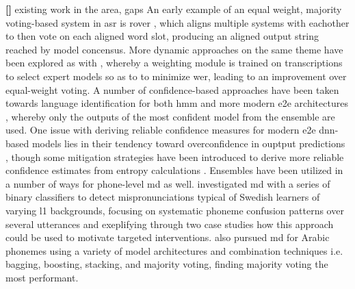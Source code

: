 \documentclass[thesis]{cluu}
\newcounter{paranum}
\newcommand{\numberedparagraph}{\par\refstepcounter{paranum}\textbf{[\theparanum] }}
\begin{document}
\numberedparagraph{existing work in the area, gaps}
An early example of an equal weight, majority voting-based system in \gls{asr} is \gls{rover} \parencite{fiscus1997post}, which aligns multiple systems with eachother to then vote on each aligned word slot, producing an aligned output string reached by model concensus. More dynamic approaches on the same theme have been explored as with \textcite{agrawalLearningWhenTrust2023}, whereby a weighting module is trained on transcriptions to select expert models so as to to minimize \gls{wer}, leading to an improvement over equal-weight voting. A number of confidence-based approaches have been taken towards language identification for both \gls{hmm} and more modern \gls{e2e} architectures \textcite{gitmanConfidencebasedEnsemblesEndtoEnd2023}, whereby only the outputs of the most confident model from the ensemble are used. One issue with deriving reliable confidence measures for modern \gls{e2e} \gls{dnn}-based models lies in their tendency toward overconfidence in ouptput predictions \parencite{weiMitigatingNeuralNetwork2022}, though some mitigation strategies have been introduced to derive more reliable confidence estimates from entropy calculations \parencite{laptevFastEntropyBasedMethods2023}. Ensembles have been utilized in a number of ways for phone-level \gls{md} as well. \textcite{ananthakrishnanUsingEnsembleClassifiers2011} investigated \gls{md} with a series of binary classifiers to detect mispronunciations typical of Swedish learners of varying \gls{l1} backgrounds, focusing on systematic phoneme confusion patterns over several utterances and exeplifying through two case studies how this approach could be used to motivate targeted interventions. \textcite{calikEnsemblebasedFrameworkMispronunciation2023a} also pursued \gls{md} for Arabic phonemes using a variety of model architectures and combination techniques i.e. bagging, boosting, stacking, and majority voting, finding majority voting the most performant.  
\end{document}

